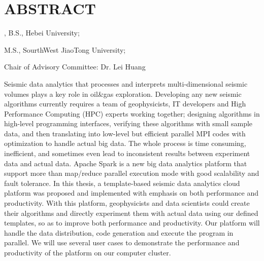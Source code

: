 %
%
%

\chapter*{ABSTRACT}

\pagestyle{plain} %
\setcounter{page}{2}

\begin{center}
\pvamumanuscripttitle

\pvamugradmonth \hspace{2pt} \pvamugradyear

\pvamufullname, B.S., Hebei University;

M.S., SourthWest JiaoTong University;

Chair of Advisory Committee: Dr. Lei Huang 

\par\end{center}

\indent Seismic data analytics that processes and interprets multi-dimensional seismic volumes plays a key role in oil\&gas exploration. Developing any new seismic algorithms currently requires a team of geophysicists, IT developers and High Performance Computing (HPC) experts working together; designing algorithms in high-level programming interfaces, verifying these algorithms with small sample data, and then translating into low-level but efficient parallel MPI codes with optimization to handle actual big data. The whole process is time consuming, inefficient, and sometimes even lead to inconsistent results between experiment data and actual data. Apache Spark is a new big data analytics platform that support more than map/reduce parallel execution mode with good scalability and fault tolerance. In this thesis, a template-based seismic data analytics cloud platform was proposed and implemented with emphasis on both performance and productivity. With this platform, geophysicists and data scientists could create their algorithms and directly experiment them with actual data using our defined templates, so as to improve both performance and productivity. Our platform will handle the data distribution, code generation and execute the program in parallel. We will use several user cases to demonstrate the performance and productivity of the platform on our computer cluster.  


 

\pagebreak{}
